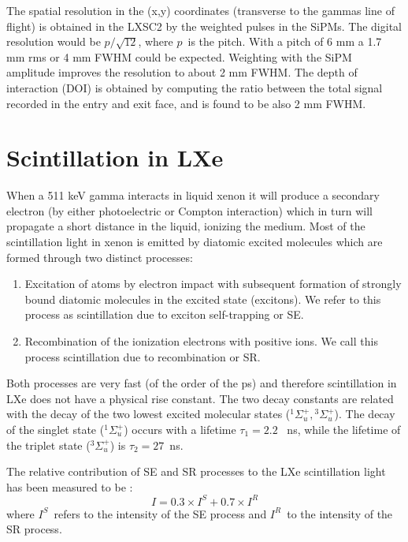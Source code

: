 \documentclass[review]{elsarticle}
\begin{document}
The spatial resolution in the (x,y) coordinates (transverse to the gammas line of flight) is obtained in the LXSC2 by the weighted pulses in the SiPMs. The digital resolution would be
$p/\sqrt{12}$, where $p$~is the pitch. With a pitch of 6 mm a 1.7 mm rms or 4 mm FWHM could be expected. Weighting with the SiPM amplitude improves the resolution to about 2 mm FWHM. The depth of interaction (DOI) is obtained by computing the ratio between the
total signal recorded in the entry and exit face, and is found to be also 2 mm FWHM. 

\section{Scintillation in LXe} \label{sec.scint}

When a 511 keV gamma interacts in liquid xenon it will produce a secondary electron (by either photoelectric or Compton interaction) which in turn will propagate a short distance in the liquid, ionizing the medium. Most of the scintillation light in xenon is emitted by diatomic excited molecules which are formed through two distinct processes:
\begin{enumerate}
\item Excitation of atoms by electron impact with subsequent formation of strongly bound diatomic molecules in the excited state (excitons). We refer to this process as scintillation due to exciton self-trapping or SE.
\item Recombination of the ionization electrons with positive ions. We call this process scintillation due to recombination or SR. 
\end{enumerate}

Both processes are very fast (of the order of the ps) and therefore scintillation in LXe does not have a physical rise constant. The two decay constants are related with the decay of the two lowest excited molecular states 
(${}^1{\Sigma_u^+},{}^3{\Sigma_u^+}$). The decay of the singlet state 
(${}^1{\Sigma_u^+}$) occurs with a lifetime $\tau_1 =2.2$~ ns, while the lifetime of the triplet state (${}^3{\Sigma_u^+}$) is $\tau_2 =27$~ns.

The relative contribution of SE and SR processes to the LXe scintillation light has been measured to be \cite{Kubota79}:
\begin{equation}
I = 0.3\times I^S + 0.7\times I^R
\end{equation}
%
where $I^S$~refers to the intensity of the SE process and $I^R$~to the intensity of the SR process.
\end{document}
